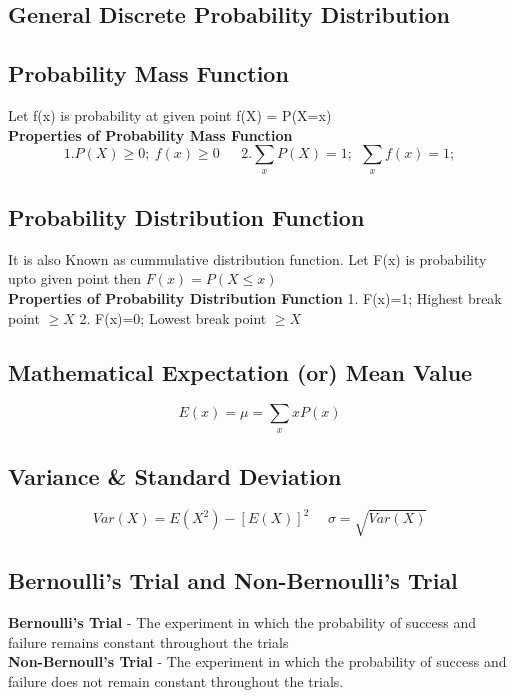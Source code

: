 \subsection{General Discrete Probability Distribution}
\subsection*{Probability Mass Function}
Let f(x) is probability at given point f(X) = P(X=x)\vspace{0.2cm}\\
\textbf{Properties of Probability Mass Function}\\
\[1. P(X)\geq 0;\ f(x) \geq 0\ \ \ \ \ \ \ 2.\sum_xP(X)=1;\ \ \sum_xf(x)=1; \]

\subsection*{Probability Distribution Function}
It is also Known as cummulative distribution function.
Let F(x) is probability upto given point then \(F(x) = P(X \leq x)\)\vspace{0.2cm}\\
\textbf{Properties of Probability Distribution Function}
1. F(x)=1; Highest break point \(\geq X\)        2. F(x)=0; Lowest break point \(\geq X\)

\subsection*{Mathematical Expectation (or) Mean Value}
\[E(x) = \mu = \sum_xxP(x)\]

\subsection*{Variance \& Standard Deviation}
\[Var(X)=E(X^2)-[E(X)]^2\ \ \ \ \ \ \sigma=\sqrt{Var(X)}\]

\subsection{Bernoulli's Trial and Non-Bernoulli's Trial}
\textbf{Bernoulli's Trial} - The experiment in which the probability of success and failure remains constant throughout the trials\vspace{0.2cm}\\
\textbf{Non-Bernoull's Trial} - The experiment in which the probability of success and failure does not remain constant throughout the trials.

